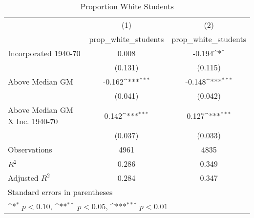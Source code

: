 \begin{table}[htbp]\centering
\def\sym#1{\ifmmode^{#1}\else\(^{#1}\)\fi}
\caption{Proportion White Students}
\begin{tabular}{l*{2}{c}}
\hline\hline
                    &\multicolumn{1}{c}{(1)}&\multicolumn{1}{c}{(2)}\\
                    &\multicolumn{1}{c}{prop\_white\_students}&\multicolumn{1}{c}{prop\_white\_students}\\
\hline
Incorporated 1940-70&       0.008         &      -0.194\sym{*}  \\
                    &     (0.131)         &     (0.115)         \\
[1em]
Above Median GM     &      -0.162\sym{***}&      -0.148\sym{***}\\
                    &     (0.041)         &     (0.042)         \\
[1em]
Above Median GM X Inc. 1940-70&       0.142\sym{***}&       0.127\sym{***}\\
                    &     (0.037)         &     (0.033)         \\
\hline
Observations        &        4961         &        4835         \\
\(R^{2}\)           &       0.286         &       0.349         \\
Adjusted \(R^{2}\)  &       0.284         &       0.347         \\
\hline\hline
\multicolumn{3}{l}{\footnotesize Standard errors in parentheses}\\
\multicolumn{3}{l}{\footnotesize \sym{*} \(p<0.10\), \sym{**} \(p<0.05\), \sym{***} \(p<0.01\)}\\
\end{tabular}
\end{table}
